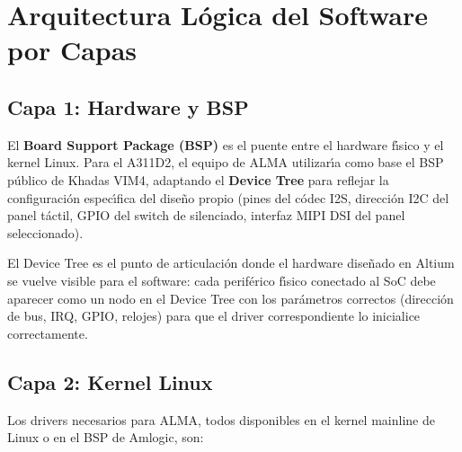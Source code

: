 \section{Arquitectura L\'{o}gica del Software por Capas}
\label{sec:hwsw_arquitectura}

\subsection{Capa 1: Hardware y BSP}

El \textbf{Board Support Package (BSP)} es el puente entre el hardware f\'{\i}sico
y el kernel Linux. Para el A311D2, el equipo de ALMA utilizar\'{\i}a como base el
BSP p\'{u}blico de Khadas VIM4, adaptando el \textbf{Device Tree} para reflejar
la configuraci\'{o}n espec\'{\i}fica del dise\~{n}o propio (pines del c\'{o}dec I2S,
direcci\'{o}n I2C del panel t\'{a}ctil, GPIO del switch de silenciado, interfaz
MIPI DSI del panel seleccionado).

El Device Tree es el punto de articulaci\'{o}n donde el hardware dise\~{n}ado
en Altium se vuelve visible para el software: cada perif\'{e}rico f\'{\i}sico
conectado al SoC debe aparecer como un nodo en el Device Tree con los
par\'{a}metros correctos (direcci\'{o}n de bus, IRQ, GPIO, relojes) para que
el driver correspondiente lo inicialice correctamente.

\subsection{Capa 2: Kernel Linux}

Los drivers necesarios para ALMA, todos disponibles en el kernel mainline de Linux
o en el BSP de Amlogic, son:

